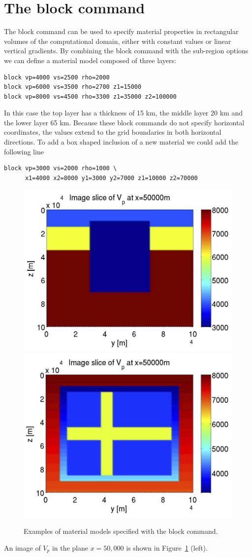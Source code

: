\documentclass[11pt]{report}
\begin{document}
\section{The block command}\label{sec:block}
The block command can be used to specify material properties in rectangular volumes of the
computational domain, either with constant values or linear vertical gradients. By combining the
block command with the sub-region options we can define a material model composed of three layers:
\begin{verbatim}
block vp=4000 vs=2500 rho=2000 
block vp=6000 vs=3500 rho=2700 z1=15000
block vp=8000 vs=4500 rho=3300 z1=35000 z2=100000
\end{verbatim}
In this case the top layer has a thickness of 15 km, the middle layer 20 km and the lower layer 65 km. Because
these block commands do not specify horizontal coordinates, the values extend to the grid boundaries in
both horizontal directions.  To add a box shaped inclusion of a new material we could add the following line
\begin{verbatim}
block vp=3000 vs=2000 rho=1000 \ 
      x1=4000 x2=8000 y1=3000 y2=7000 z1=10000 z2=70000
\end{verbatim}
\begin{figure}[ht]
\begin{centering}
  \includegraphics[width=0.45\linewidth]{figures/blockVpimage.png}
  \includegraphics[width=0.45\linewidth]{figures/flag.png}
  \caption{Examples of material models specified with the block command.}
  \label{fig:blockpics}
\end{centering}
\end{figure}
An image of $V_p$ in the plane $x=50,000$ is shown in Figure~\ref{fig:blockpics} (left).
\end{document}
